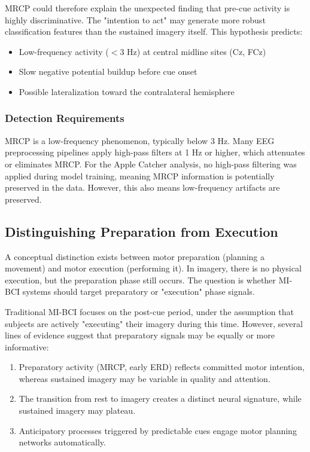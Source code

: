 MRCP could therefore explain the unexpected finding that pre-cue activity is highly discriminative. The "intention to act" may generate more robust classification features than the sustained imagery itself. This hypothesis predicts:

\begin{itemize}
    \item Low-frequency activity ($<$3 Hz) at central midline sites (Cz, FCz)
    \item Slow negative potential buildup before cue onset
    \item Possible lateralization toward the contralateral hemisphere
\end{itemize}

\subsubsection{Detection Requirements}

MRCP is a low-frequency phenomenon, typically below 3 Hz. Many EEG preprocessing pipelines apply high-pass filters at 1 Hz or higher, which attenuates or eliminates MRCP. For the Apple Catcher analysis, no high-pass filtering was applied during model training, meaning MRCP information is potentially preserved in the data. However, this also means low-frequency artifacts are preserved.


\subsection{Distinguishing Preparation from Execution}
\label{subsec:bg_prep_vs_exec}

A conceptual distinction exists between motor preparation (planning a movement) and motor execution (performing it). In imagery, there is no physical execution, but the preparation phase still occurs. The question is whether MI-BCI systems should target preparatory or "execution" phase signals.

Traditional MI-BCI focuses on the post-cue period, under the assumption that subjects are actively "executing" their imagery during this time. However, several lines of evidence suggest that preparatory signals may be equally or more informative:

\begin{enumerate}
    \item Preparatory activity (MRCP, early ERD) reflects committed motor intention, whereas sustained imagery may be variable in quality and attention.
    \item The transition from rest to imagery creates a distinct neural signature, while sustained imagery may plateau.
    \item Anticipatory processes triggered by predictable cues engage motor planning networks automatically.
\end{enumerate}

